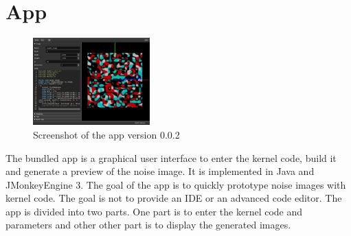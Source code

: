 %
%
%
%

\section{App}

\begin{figure}
\centering
\includegraphics[width=0.4\textwidth]{Screenshot_20211121_152848.png}
\caption{Screenshot of the app version 0.0.2}\label{fig:app_screenshot}
\end{figure}

The bundled app is a graphical user interface to enter the kernel code, build
it and generate a preview of the noise image. It is implemented 
in Java and JMonkeyEngine 3. The goal of the app is to quickly prototype
noise images with kernel code. The goal is not to provide an IDE or an advanced
code editor. The app is divided into two parts. One part is to enter the kernel code and
parameters and other other part is to display the generated images.

